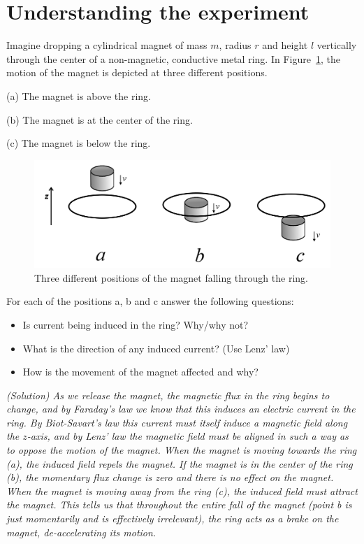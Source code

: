 \documentclass[%
oneside,                 %
final,                   %
10pt]{article}
\begin{document}
\noindent
\section{Understanding the experiment}
Imagine dropping a cylindrical magnet of mass $m$, radius $r$ and height $l$ vertically through the center of a non-magnetic, conductive metal ring. In Figure~\ref{fig:fallingmagnet}, the motion of the magnet is depicted at three different positions.

(a) The magnet is above the ring.

(b) The magnet is at the center of the ring.

(c) The magnet is below the ring.


\begin{figure}[!ht]  %
  \centerline{\includegraphics[width=0.9\linewidth]{figures/fallingmagnet.png}}
  \caption{
  Three different positions of the magnet falling through the ring. \label{fig:fallingmagnet}
  }
\end{figure}


\noindent
For each of the positions a, b and c answer the following questions:
\begin{itemize}
  \item Is current being induced in the ring? Why/why not?

  \item What is the direction of any induced current? (Use Lenz' law)

  \item How is the movement of the magnet affected and why?
\end{itemize}

\noindent
\emph{(Solution) As we release the magnet, the magnetic flux in the ring begins to change, and by Faraday's law we know that this induces an electric current in the ring.
By Biot-Savart's law this current must itself induce a magnetic field along the $z$-axis, and by Lenz' law the magnetic field must be aligned in such a way as to oppose the motion of the magnet. When the magnet is moving towards the ring (a), the induced field repels the magnet.
If the magnet is in the center of the ring (b), the momentary flux change is zero and there is no effect on the magnet. When the magnet is moving away from the ring (c), the induced field must attract the magnet.
This tells us that throughout the entire fall of the magnet (point b is just momentarily and is effectively irrelevant), the ring acts as a brake on the magnet, de-accelerating its motion.}
\end{document}
